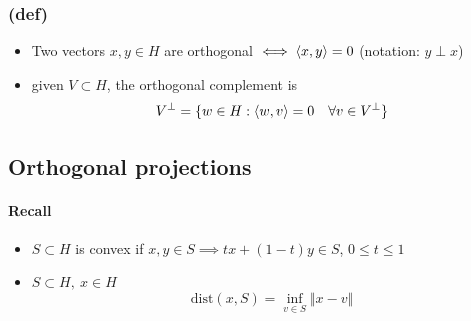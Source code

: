 \subsubsection{(def)}
\begin{itemize}
    \item Two vectors $x,y\in H$ are orthogonal $\iff \langle {x} , {y} \rangle=0$ (notation: $y\perp x$)
    \item given $V\subset H$, the orthogonal complement is $$V^{\perp}=\{w\in H:\langle {w} , {v} \rangle =0 \quad \forall v\in V^{\perp}\}$$
\end{itemize}
\subsection{Orthogonal projections}
\paragraph{Recall}
\begin{itemize}
    \item $S\subset H$ is convex if $x,y\in S\implies tx+(1-t)y\in S$, $0\leq t\leq 1$
    \item $S\subset H, \ x\in H$
    $$\mathrm{dist}(x,S)=\inf_{v\in S}\Vert x-v\Vert$$
\end{itemize}
